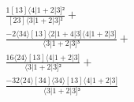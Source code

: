 \documentclass[varwidth, border=5pt]{standalone}
\begin{document}
\begin{my}
$\begin{gathered}
\scriptscriptstyle\frac{1[13]⟨4|1+2|3]²}{[23]⟨3|1+2|3]²} +\\
\scriptscriptstyle\frac{-2⟨34⟩[13]⟨2|1+4|3]⟨4|1+2|3]}{⟨3|1+2|3]³} +\\
\scriptscriptstyle\frac{16⟨24⟩[13]⟨4|1+2|3]}{⟨3|1+2|3]²} +\\
\scriptscriptstyle\frac{-32⟨24⟩[34]⟨34⟩[13]⟨4|1+2|3]}{⟨3|1+2|3]³} \phantom{+}
\end{gathered}$
\end{my}
\end{document}
